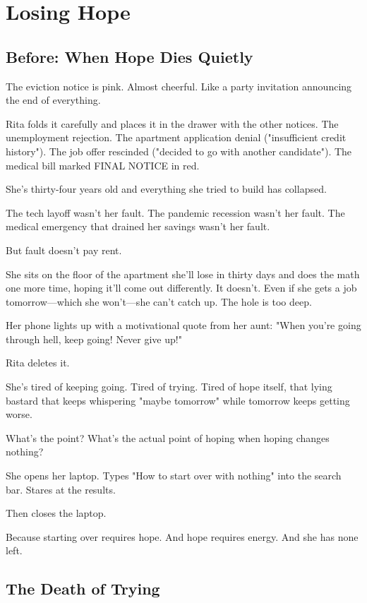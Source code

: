 \documentclass[11pt,twoside]{book}
\begin{document}
\chapter{Losing Hope}

\section*{Before: When Hope Dies Quietly}

The eviction notice is pink. Almost cheerful. Like a party invitation announcing the end of everything.

Rita folds it carefully and places it in the drawer with the other notices. The unemployment rejection. The apartment application denial ("insufficient credit history"). The job offer rescinded ("decided to go with another candidate"). The medical bill marked FINAL NOTICE in red.

She's thirty-four years old and everything she tried to build has collapsed.

The tech layoff wasn't her fault. The pandemic recession wasn't her fault. The medical emergency that drained her savings wasn't her fault.

But fault doesn't pay rent.

She sits on the floor of the apartment she'll lose in thirty days and does the math one more time, hoping it'll come out differently. It doesn't. Even if she gets a job tomorrow—which she won't—she can't catch up. The hole is too deep.

Her phone lights up with a motivational quote from her aunt: "When you're going through hell, keep going! Never give up!"

Rita deletes it.

She's tired of keeping going. Tired of trying. Tired of hope itself, that lying bastard that keeps whispering "maybe tomorrow" while tomorrow keeps getting worse.

What's the point? What's the actual point of hoping when hoping changes nothing?

She opens her laptop. Types "How to start over with nothing" into the search bar. Stares at the results.

Then closes the laptop.

Because starting over requires hope. And hope requires energy. And she has none left.

\section*{The Death of Trying}
\end{document}

